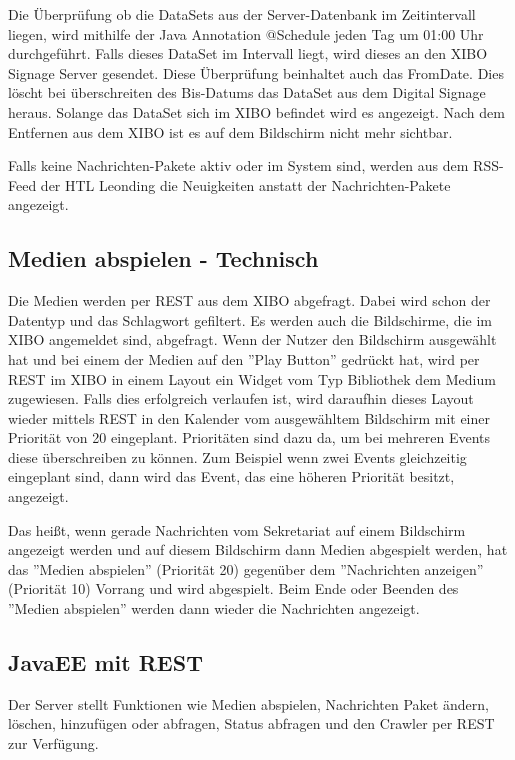 Die Überprüfung ob die DataSets aus der Server-Datenbank im Zeitintervall liegen, wird mithilfe der Java Annotation @Schedule jeden Tag um 01:00 Uhr durchgeführt. Falls dieses DataSet im Intervall liegt, wird dieses an den XIBO Signage Server gesendet. Diese Überprüfung beinhaltet auch das FromDate. Dies löscht bei überschreiten des Bis-Datums das DataSet aus dem Digital Signage heraus. Solange das DataSet sich im XIBO befindet wird es angezeigt. Nach dem Entfernen aus dem XIBO ist es auf dem Bildschirm nicht mehr sichtbar.

Falls keine Nachrichten-Pakete aktiv oder im System sind, werden aus dem RSS-Feed der HTL Leonding die Neuigkeiten anstatt der Nachrichten-Pakete angezeigt.

\subsection{Medien abspielen - Technisch}\label{sec:playmediatechnical}
Die Medien werden per REST aus dem XIBO abgefragt. Dabei wird schon der Datentyp und das Schlagwort gefiltert. Es werden auch die Bildschirme, die im XIBO angemeldet sind, abgefragt. Wenn der Nutzer den Bildschirm ausgewählt hat und bei einem der Medien auf den ''Play Button'' gedrückt hat, wird per REST im XIBO in einem Layout ein Widget vom Typ Bibliothek dem Medium zugewiesen. Falls dies erfolgreich verlaufen ist, wird daraufhin dieses Layout wieder mittels REST in den Kalender vom ausgewähltem Bildschirm mit einer Priorität von 20 eingeplant. Prioritäten sind dazu da, um bei mehreren Events diese überschreiben zu können. Zum Beispiel wenn zwei Events gleichzeitig eingeplant sind, dann wird das Event, das eine höheren Priorität besitzt, angezeigt.

Das heißt, wenn gerade Nachrichten vom Sekretariat auf einem Bildschirm angezeigt werden und auf diesem Bildschirm dann Medien abgespielt werden, hat das ''Medien abspielen'' (Priorität 20) gegenüber dem ''Nachrichten anzeigen'' (Priorität 10) Vorrang und wird abgespielt. Beim Ende oder Beenden des ''Medien abspielen'' werden dann wieder die Nachrichten angezeigt.

\subsection{JavaEE mit REST}\label{sec:javaeeresttechnical}
Der Server stellt Funktionen wie Medien abspielen, Nachrichten Paket ändern, löschen, hinzufügen oder abfragen, Status abfragen und den Crawler per REST zur Verfügung.

